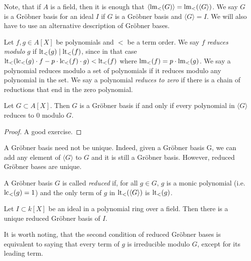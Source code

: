 Note, that if $A$ is a field, then it is enough that $\langle \operatorname{lm}_{<}(G) \rangle = \operatorname{lm}_{<}(\langle G \rangle)$. We say $G$ is a Gröbner basis for an ideal $I$ if $G$ is a Gröbner basis and $\langle G \rangle = I$. We will also have to use an alternative description of Gröbner bases.

\begin{definition}
  Let $f, g \in A[X]$ be polynomials and $<$ be a term order. We say $f$ \textit{reduces modulo} $g$ if $\operatorname{lt}_{<}(g) \mid \operatorname{lt}_{<}(f)$, since in that case $\operatorname{lt}_{<}(\operatorname{lc}_{<}(g)\cdot f - p\cdot \operatorname{lc}_{<}(f) \cdot g) < \operatorname{lt}_{<}(f)$ where $\operatorname{lm}_{<}(f) = p \cdot \operatorname{lm}_{<}(g)$. We say a polynomial reduces modulo a set of polynomials if it reduces modulo any polynomial in the set. We say a polynomial \textit{reduces to zero} if there is a chain of reductions that end in the zero polynomial.
\end{definition}

\begin{theorem}\label{thm:grb}
  Let $G \subset A[X]$. Then $G$ is a Gröbner basis if and only if every polynomial in $\langle G \rangle$ reduces to 0 modulo $G$.
\end{theorem}
\begin{proof}
  A good exercise.
\end{proof}

A Gröbner basis need not be unique. Indeed, given a Gröbner basis G, we can add any element of $\langle G \rangle$ to $G$ and it is still a Gröbner basis. However, reduced Gröbner bases are unique.

\begin{definition}
  A Gröbner basis $G$ is called \textit{reduced} if, for all $g \in G$, $g$ is a monic polynomial (i.e. $\operatorname{lc}_{<}(g) = 1$) and the only term of $g$ in $\operatorname{lt}_{<}(\langle G \rangle)$ is $\operatorname{lt}_{<}(g)$.
\end{definition}
\begin{theorem}
  Let $I \subset k[X]$ be an ideal in a polynomial ring over a field. Then there is a unique reduced Gröbner basis of $I$.
\end{theorem}

It is worth noting, that the second condition of reduced Gröbner bases is equivalent to saying that every term of $g$ is irreducible modulo $G$, except for its leading term.
